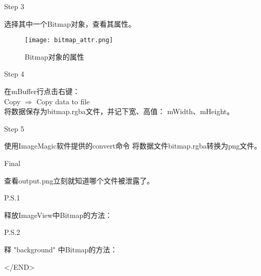 ﻿\documentclass{beamer}
\begin{document}
  \begin{frame}{Step 3}
  \begin{framedtext}
    选择其中一个Bitmap对象，查看其属性。
  \end{framedtext}
  \end{frame}

  \begin{frame}
    \begin{figure}
      \centering
      \texttt{[image: bitmap\_attr.png]}\\
      \caption{Bitmap对象的属性}\label{fig:attr}
    \end{figure}
  \end{frame}

  \begin{frame}{Step 4}
  \begin{framedtext}
    在mBuffer行点击右键：\\
    Copy $\Rightarrow$ Copy data to file\\
    将数据保存为bitmap.rgba文件，并记下宽、高值：
    mWidth、mHeight。
  \end{framedtext}
  \end{frame}

  \begin{frame}{Step 5}
  \begin{framedtext}
    使用ImageMagic软件提供的convert命令
    将数据文件bitmap.rgba转换为png文件。
  \end{framedtext}
  \end{frame}

  \begin{frame}
  \end{frame}

  \begin{frame}{Final}
  \begin{framedtext}
    查看output.png立刻就知道哪个文件被泄露了。
  \end{framedtext}
  \end{frame}
  
  \begin{frame}{P.S.1}
    \begin{framedtext}
      释放ImageView中Bitmap的方法：
    \end{framedtext}
  \end{frame}
  
    \begin{frame}{P.S.2}
    \begin{framedtext}
      释 "background" 中Bitmap的方法：
    \end{framedtext}
  \end{frame}

  \begin{frame}
    \begin{center}
      \Large
      \textless/END\textgreater
    \end{center}
  \end{frame}
\end{document}
